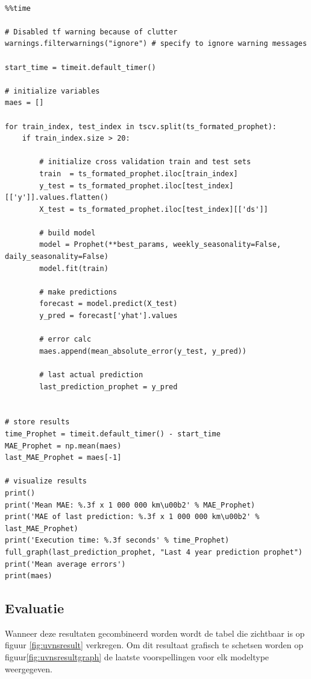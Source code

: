 \begin{verbatim}

%%time

# Disabled tf warning because of clutter
warnings.filterwarnings("ignore") # specify to ignore warning messages

start_time = timeit.default_timer()

# initialize variables
maes = []

for train_index, test_index in tscv.split(ts_formated_prophet):
    if train_index.size > 20:  
    
        # initialize cross validation train and test sets
        train  = ts_formated_prophet.iloc[train_index]
        y_test = ts_formated_prophet.iloc[test_index][['y']].values.flatten()
        X_test = ts_formated_prophet.iloc[test_index][['ds']]
        
        # build model
        model = Prophet(**best_params, weekly_seasonality=False, daily_seasonality=False)
        model.fit(train)
        
        # make predictions
        forecast = model.predict(X_test)
        y_pred = forecast['yhat'].values
        
        # error calc
        maes.append(mean_absolute_error(y_test, y_pred))
        
        # last actual prediction 
        last_prediction_prophet = y_pred


# store results
time_Prophet = timeit.default_timer() - start_time
MAE_Prophet = np.mean(maes)
last_MAE_Prophet = maes[-1]

# visualize results
print()
print('Mean MAE: %.3f x 1 000 000 km\u00b2' % MAE_Prophet)
print('MAE of last prediction: %.3f x 1 000 000 km\u00b2' % last_MAE_Prophet)
print('Execution time: %.3f seconds' % time_Prophet)
full_graph(last_prediction_prophet, "Last 4 year prediction prophet")
print('Mean average errors')
print(maes)

\end{verbatim}

\clearpage
\subsection{Evaluatie}

Wanneer deze resultaten gecombineerd worden wordt de tabel die zichtbaar is op figuur \ref{fig:uvnsresult} verkregen. Om dit resultaat grafisch te schetsen worden op figuur\ref{fig:uvnsresultgraph} de laatste voorspellingen voor elk modeltype weergegeven.

